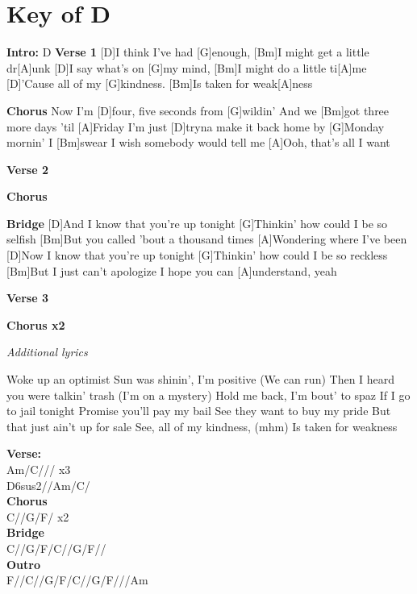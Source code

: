 \documentclass{article}
\begin{document}
\section{Key of D}
\begin{guitar}
\begin{multicols}{2}


\textbf{Intro:} D
\textbf{Verse 1}
[D]I think I've had [G]enough, 
[Bm]I might get a little dr[A]unk
[D]I say what's on [G]my mind,
[Bm]I might do a little ti[A]me
[D]'Cause all of my [G]kindness. 
[Bm]Is taken for weak[A]ness


\textbf{Chorus}
Now I'm [D]four, five seconds from [G]wildin'
And we [Bm]got three more days 'til [A]Friday
I'm just [D]tryna make it back home by [G]Monday mornin'
I [Bm]swear I wish somebody would tell me
[A]Ooh, that's all I want

\textbf{Verse 2}

\textbf{Chorus}

\textbf{Bridge}
[D]And I know that you're up tonight
[G]Thinkin' how could I be so selfish
[Bm]But you called 'bout a thousand times
[A]Wondering where I've been
[D]Now I know that you're up tonight
[G]Thinkin' how could I be so reckless
[Bm]But I just can't apologize
I hope you can [A]understand, yeah

\textbf{Verse 3}

\textbf{Chorus x2}


\end{multicols}

\begin{center}
\textit{Additional lyrics}
\end{center}

\begin{multicols}{2}\begin{flushleft}
Woke up an optimist
Sun was shinin', I'm positive (We can run)
Then I heard you were talkin' trash (I'm on a mystery)
Hold me back, I'm bout' to spaz
\columnbreak
If I go to jail tonight
Promise you'll pay my bail
See they want to buy my pride
But that just ain't up for sale
See, all of my kindness, (mhm)
Is taken for weakness

\end{flushleft}
\end{multicols}
\end{guitar}

\textbf{Verse:}\\
Am/C/// x3\\
D6sus2//Am/C/\\
\textbf{Chorus}\\
C//G/F/ x2\\
\textbf{Bridge}\\
C//G/F/C//G/F//\\
\textbf{Outro}\\
F//C//G/F/C//G/F///Am
\end{document}
